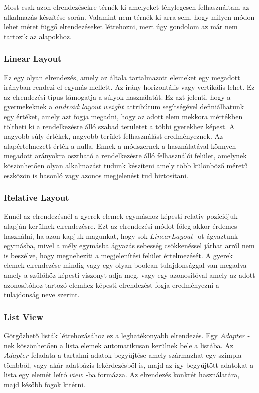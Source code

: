 \documentclass[12pt]{report}
\theoremstyle{definition}
\begin{document}
	Most csak azon elrendezésekre térnék ki amelyeket ténylegesen felhasználtam az alkalmazás készítése során. Valamint nem térnék ki arra sem, hogy milyen módon lehet méret függő elrendezéseket létrehozni, mert úgy gondolom az már nem tartozik az alapokhoz.
	
	\subsubsection{Linear Layout}
	Ez egy olyan elrendezés, amely az általa tartalmazott elemeket egy megadott irányban rendezi el egymás mellett. Az irány horizontális vagy vertikális lehet. Ez az elrendezési típus támogatja a súlyok használatát. Ez azt jelenti, hogy a gyermekeknek a $android:layout\_weight$ attribútum segítségével definiálhatunk egy értéket, amely azt fogja megadni, hogy az adott elem mekkora mértékben töltheti ki a rendelkezésre álló szabad területet a többi gyerekhez képest. A nagyobb súly értékek, nagyobb terület felhasználást eredményeznek. Az alapértelmezett érték a nulla. Ennek a módszernek a használatával könnyen megadott arányokra osztható a rendelkezésre álló felhasználói felület, amelynek köszönhetően olyan alkalmazást tudunk készíteni amely több különböző méretű eszközön is hasonló vagy azonos megjelenést tud biztosítani.
	
	\subsubsection{Relative Layout}
	Ennél az elrendezésnél a gyerek elemek egymáshoz képesti relatív pozíciójuk alapján kerülnek elrendezésre. Ezt az elrendezési módot főleg akkor érdemes használni, ha azon kapjuk magunkat, hogy sok $LinearLayout$ -ot ágyaztunk egymásba, mivel a mély egymásba ágyazás sebesség csökkenéssel járhat arról nem is beszélve, hogy megnehezíti a megjelenítési felület értelmezését. A gyerek elemek elrendezése mindig vagy egy olyan boolean tulajdonsággal van megadva amely a szülőhöz képesti viszonyt adja meg, vagy egy azonosítóval amely az adott azonosítóhoz tartozó elemhez képesti elrendezést fogja eredményezni a tulajdonság neve szerint.
	
	\subsubsection{List View}
	Görgőzhető listák létrehozásához ez a leghatékonyabb elrendezés. Egy $Adapter$ -nek köszönhetően a lista elemek automatikusan kerülnek bele a listába. Az $Adapter$ feladata a tartalmi adatok begyűjtése amely származhat egy szimpla tömbből, vagy akár adatbázis lekérdezésből is, majd az így begyűjtött adatokat a lista egy elemét leíró $view$ -ba formázza. Az elrendezés konkrét használatára, majd később fogok kitérni.
	
\end{document}
